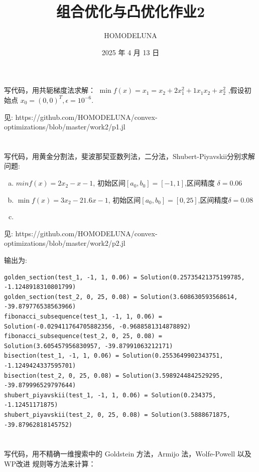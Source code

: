 \documentclass[a4paper]{article}
\title{组合优化与凸优化作业2}
\author{HOMODELUNA}
\date{2025 年 4 月 13 日}
\begin{document}
\maketitle
\section{}

写代码，用共轭梯度法求解： \(\min f(x) = x_1 = x_2 + 2x_1^2 + 1x_1x_2 + x_2^2\)
,假设初始点 $x_0 = (0,0)^T, \epsilon = 10^{-6}$.

见: https://github.com/HOMODELUNA/convex-optimizations/blob/master/work2/p1.jl

\section{}

写代码，用黄金分割法，斐波那契亚数列法，二分法，Shubert-Piyavskii分别求解问题:

\begin{enumerate}[(a)]
    \item \(min f(x) = 2x_2 -x -1\), 初始区间\( [a_0,b_0] = [-1,1]\),区间精度 \(\delta = 0.06\)
    
    \item \(\min f(x)=3x_2 - 21.6x-1\), 初始区间\([a_0,b_0] = [0,25]\),区间精度\(\delta = 0.08\)
    \item 
\end{enumerate}

见: https://github.com/HOMODELUNA/convex-optimizations/blob/master/work2/p2.jl


输出为:
\begin{lstlisting}
golden_section(test_1, -1, 1, 0.06) = Solution(0.25735421375199785, -1.1248918310801799)
golden_section(test_2, 0, 25, 0.08) = Solution(3.608630593568614, -39.879776538563966)
fibonacci_subsequence(test_1, -1, 1, 0.06) = Solution(-0.029411764705882356, -0.9688581314878892)
fibonacci_subsequence(test_2, 0, 25, 0.08) = Solution(3.605457956830957, -39.87991063212171)
bisection(test_1, -1, 1, 0.06) = Solution(0.2553649902343751, -1.1249424337595701)
bisection(test_2, 0, 25, 0.08) = Solution(3.5989244842529295, -39.879996529797644)
shubert_piyavskii(test_1, -1, 1, 0.06) = Solution(0.234375, -1.12451171875)
shubert_piyavskii(test_2, 0, 25, 0.08) = Solution(3.5888671875, -39.87962818145752)
\end{lstlisting}

\section{}
写代码，用不精确一维搜索中的 Goldstein 方法，Armijo 法，Wolfe-Powell 以及WP改进
规则等方法来计算：
\end{document}
